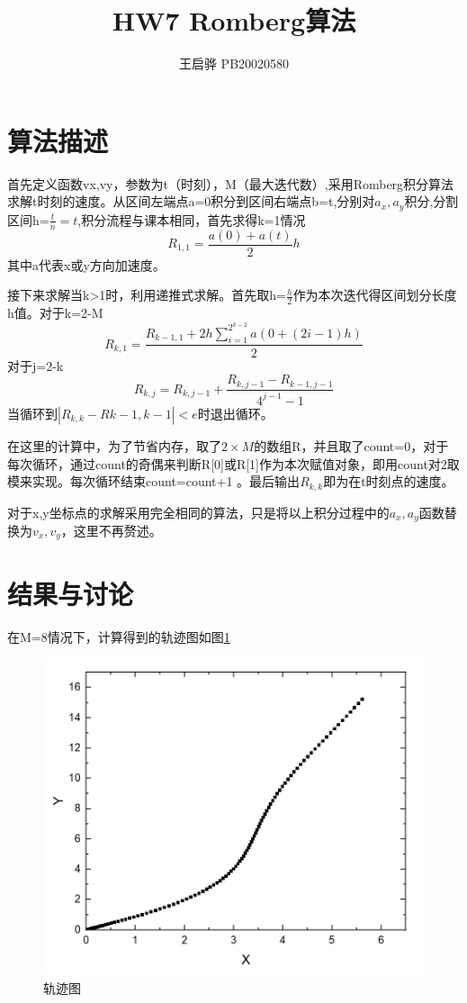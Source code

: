\documentclass{article}
\title{\songti \zihao{2}\bfseries HW7 Romberg算法}
\author{王启骅 PB20020580}
\begin{document}
	\maketitle
	\section{算法描述}
	首先定义函数vx,vy，参数为t（时刻），M（最大迭代数）,采用Romberg积分算法求解t时刻的速度。从区间左端点a=0积分到区间右端点b=t,分别对$ a_x,a_y $积分,分割区间h=$ \frac{t}{n}=t $,积分流程与课本相同，首先求得k=1情况
	\begin{equation}
		R_{1,1}=\frac{a(0)+a(t)}{2}h
	\end{equation}
其中a代表x或y方向加速度。


接下来求解当k>1时，利用递推式求解。首先取h=$ \frac{h}{2} $作为本次迭代得区间划分长度h值。对于k=2-M
\begin{equation}
	R_{k,1}=\frac{R_{k-1,1}+2h\sum_{i=1}^{2^{k-2}}a(0+(2i-1)h)}{2}
\end{equation}
对于j=2-k
\begin{equation}
	R_{k,j}=R_{k,j-1}+\frac{R_{k,j-1}-R_{k-1,j-1}}{4^{j-1}-1}
\end{equation}
当循环到$ |R_{k,k}-R{k-1,k-1}|<e $时退出循环。


在这里的计算中，为了节省内存，取了$ 2\times M $的数组R，并且取了count=0，对于每次循环，通过count的奇偶来判断R[0]或R[1]作为本次赋值对象，即用count对2取模来实现。每次循环结束count=count+1 。最后输出$ R_{k,k} $即为在t时刻点的速度。


对于x,y坐标点的求解采用完全相同的算法，只是将以上积分过程中的$ a_x,a_y $函数替换为$ v_x,v_y$，这里不再赘述。
	\section{结果与讨论}
在M=8情况下，计算得到的轨迹图如图\ref{fig:1}
\begin{figure}[!h]
	
	\centering
	\includegraphics[scale=0.8]{track}
	\caption{\heiti{}轨迹图}
	\label{fig:1}
\end{figure}
	
\end{document}
